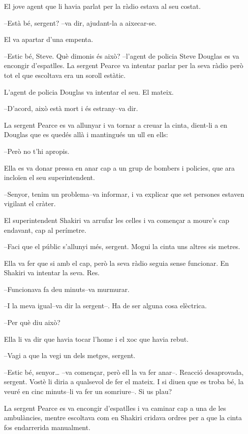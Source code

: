 El jove agent que li havia parlat per la ràdio estava al seu costat.

--Està bé, sergent? --va dir, ajudant-la a aixecar-se.

El va apartar d'una empenta.

--Estic bé, Steve. Què dimonis és això? --l'agent de policia Steve
Douglas es va encongir d'espatlles. La sergent Pearce va intentar parlar
per la seva ràdio però tot el que escoltava era un soroll estàtic.

L'agent de policia Douglas va intentar el seu. El mateix.

--D'acord, això està mort i és estrany--va dir.

La sergent Pearce es va allunyar i va tornar a creuar la cinta, dient-li
a en Douglas que es quedés allà i mantingués un ull en ells:

--Però no t'hi apropis.

Ella es va donar pressa en anar cap a un grup de bombers i policies, que
ara incloïen el seu superintendent.

--Senyor, tenim un problema--va informar, i va explicar que set persones
estaven vigilant el cràter.

El superintendent Shakiri va arrufar les celles i va començar a moure's
cap endavant, cap al perímetre.

--Faci que el públic s'allunyi més, sergent. Mogui la cinta uns altres
sis metres.

Ella va fer que si amb el cap, però la seva ràdio seguia sense
funcionar. En Shakiri va intentar la seva. Res.

--Funcionava fa deu minuts--va murmurar.

--I la meva igual--va dir la sergent--. Ha de ser alguna cosa elèctrica.

--Per què diu això?

Ella li va dir que havia tocar l'home i el xoc que havia rebut.

--Vagi a que la vegi un dels metges, sergent.

--Estic bé, senyor\ldots{} --va començar, però ell la va fer anar--.
Reacció desaprovada, sergent. Vostè li diria a qualsevol de fer el
mateix. I si diuen que es troba bé, la veuré en cinc minuts--li va fer
un somriure--. Si us plau?

La sergent Pearce es va encongir d'espatlles i va caminar cap a una de
les ambulàncies, mentre escoltava com en Shakiri cridava ordres per a
que la cinta fos endarrerida manualment.

